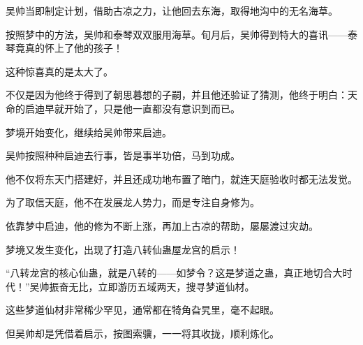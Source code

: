 \begin{this_body}
吴帅当即制定计划，借助古凉之力，让他回去东海，取得地沟中的无名海草。

按照梦中的方法，吴帅和泰琴双双服用海草。旬月后，吴帅得到特大的喜讯——泰琴竟真的怀上了他的孩子！

这种惊喜真的是太大了。

不仅是因为他终于得到了朝思暮想的子嗣，并且他还验证了猜测，他终于明白：天命的启迪早就开始了，只是他一直都没有意识到而已。

梦境开始变化，继续给吴帅带来启迪。

吴帅按照种种启迪去行事，皆是事半功倍，马到功成。

他不仅将东天门搭建好，并且还成功地布置了暗门，就连天庭验收时都无法发觉。

为了取信天庭，他不在发展龙人势力，而是专注自身修为。

依靠梦中启迪，他的修为不断上涨，再加上古凉的帮助，屡屡渡过灾劫。

梦境又发生变化，出现了打造八转仙蛊屋龙宫的启示！

“八转龙宫的核心仙蛊，就是八转的——如梦令？这是梦道之蛊，真正地切合大时代！”吴帅振奋无比，立即游历五域两天，搜寻梦道仙材。

这些梦道仙材非常稀少罕见，通常都在犄角旮旯里，毫不起眼。

但吴帅却是凭借着启示，按图索骥，一一将其收拢，顺利炼化。

\end{this_body}

